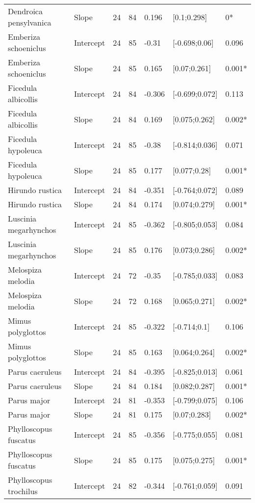 \documentclass{article}
\begin{document}
\begin{table}[H]
\begin{tabular}{llrrlll}
  Dendroica pensylvanica & Slope &  24 &  84 & 0.196 & [0.1;0.298] & 0* \\ 
  Emberiza schoeniclus & Intercept &  24 &  85 & -0.31 & [-0.698;0.06] & 0.096 \\ 
  Emberiza schoeniclus & Slope &  24 &  85 & 0.165 & [0.07;0.261] & 0.001* \\ 
  Ficedula albicollis & Intercept &  24 &  84 & -0.306 & [-0.699;0.072] & 0.113 \\ 
  Ficedula albicollis & Slope &  24 &  84 & 0.169 & [0.075;0.262] & 0.002* \\ 
  Ficedula hypoleuca & Intercept &  24 &  85 & -0.38 & [-0.814;0.036] & 0.071 \\ 
  Ficedula hypoleuca & Slope &  24 &  85 & 0.177 & [0.077;0.28] & 0.001* \\ 
  Hirundo rustica & Intercept &  24 &  84 & -0.351 & [-0.764;0.072] & 0.089 \\ 
  Hirundo rustica & Slope &  24 &  84 & 0.174 & [0.074;0.279] & 0.001* \\ 
  Luscinia megarhynchos & Intercept &  24 &  85 & -0.362 & [-0.805;0.053] & 0.084 \\ 
  Luscinia megarhynchos & Slope &  24 &  85 & 0.176 & [0.073;0.286] & 0.002* \\ 
  Melospiza melodia & Intercept &  24 &  72 & -0.35 & [-0.785;0.033] & 0.083 \\ 
  Melospiza melodia & Slope &  24 &  72 & 0.168 & [0.065;0.271] & 0.002* \\ 
  Mimus polyglottos & Intercept &  24 &  85 & -0.322 & [-0.714;0.1] & 0.106 \\ 
  Mimus polyglottos & Slope &  24 &  85 & 0.163 & [0.064;0.264] & 0.002* \\ 
  Parus caeruleus & Intercept &  24 &  84 & -0.395 & [-0.825;0.013] & 0.061 \\ 
  Parus caeruleus & Slope &  24 &  84 & 0.184 & [0.082;0.287] & 0.001* \\ 
  Parus major & Intercept &  24 &  81 & -0.353 & [-0.799;0.075] & 0.106 \\ 
  Parus major & Slope &  24 &  81 & 0.175 & [0.07;0.283] & 0.002* \\ 
  Phylloscopus fuscatus & Intercept &  24 &  85 & -0.356 & [-0.775;0.055] & 0.081 \\ 
  Phylloscopus fuscatus & Slope &  24 &  85 & 0.175 & [0.075;0.275] & 0.001* \\ 
  Phylloscopus trochilus & Intercept &  24 &  82 & -0.344 & [-0.761;0.059] & 0.091 \\ 

\end{tabular}
\end{table}
\end{document}
